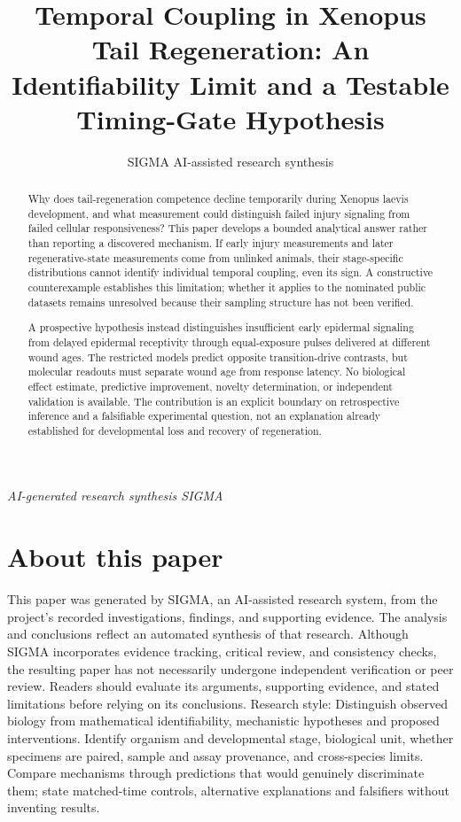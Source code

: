\documentclass[11pt]{article}
\title{Temporal Coupling in Xenopus Tail Regeneration: An Identifiability Limit and a Testable Timing-Gate Hypothesis}
\date{}
\author{SIGMA AI-assisted research synthesis}
\begin{document}
\maketitle
\begin{center}\small\textit{AI-generated research synthesis \textperiodcentered{} SIGMA}\end{center}

\begin{abstract}
Why does tail-regeneration competence decline temporarily during Xenopus laevis development, and what measurement could distinguish failed injury signaling from failed cellular responsiveness? This paper develops a bounded analytical answer rather than reporting a discovered mechanism. If early injury measurements and later regenerative-state measurements come from unlinked animals, their stage-specific distributions cannot identify individual temporal coupling, even its sign. A constructive counterexample establishes this limitation; whether it applies to the nominated public datasets remains unresolved because their sampling structure has not been verified.

A prospective hypothesis instead distinguishes insufficient early epidermal signaling from delayed epidermal receptivity through equal-exposure pulses delivered at different wound ages. The restricted models predict opposite transition-drive contrasts, but molecular readouts must separate wound age from response latency. No biological effect estimate, predictive improvement, novelty determination, or independent validation is available. The contribution is an explicit boundary on retrospective inference and a falsifiable experimental question, not an explanation already established for developmental loss and recovery of regeneration.
\end{abstract}
\section*{About this paper}
This paper was generated by SIGMA, an AI-assisted research system, from the project's recorded investigations, findings, and supporting evidence.
The analysis and conclusions reflect an automated synthesis of that research. Although SIGMA incorporates evidence tracking, critical review, and consistency checks, the resulting paper has not necessarily undergone independent verification or peer review.
Readers should evaluate its arguments, supporting evidence, and stated limitations before relying on its conclusions.
Research style: Distinguish observed biology from mathematical identifiability, mechanistic hypotheses and proposed interventions. Identify organism and developmental stage, biological unit, whether specimens are paired, sample and assay provenance, and cross-species limits. Compare mechanisms through predictions that would genuinely discriminate them; state matched-time controls, alternative explanations and falsifiers without inventing results.
\end{document}
